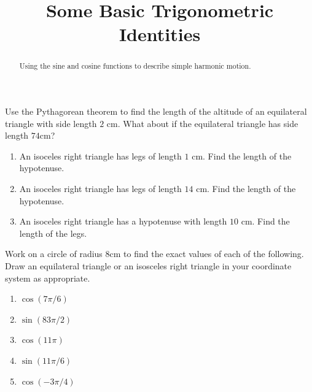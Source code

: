 \documentclass{ximera}
\title{Some Basic Trigonometric Identities}
\begin{document}
\begin{abstract}
Using the sine and cosine functions to describe simple harmonic motion.
\end{abstract}
\maketitle


\begin{question} \label{Qppf3}
Use the Pythagorean theorem to find the length of the altitude of an equilateral triangle with side length $2$ cm. What about if the equilateral triangle has side length $74$cm?
\end{question}

\begin{question} \label{Qof3efr3}
\begin{enumerate}
\item An isoceles right triangle has legs of length $1$ cm. Find the length of the hypotenuse.

\item An isoceles right triangle has legs of length $14$ cm. Find the length of the hypotenuse.

\item An isoceles right triangle has a hypotenuse with length $10$ cm. Find the length of the legs.
\end{enumerate}
\end{question}


\begin{question} \label{Qpefere3}
Work on a circle of radius $8$cm to find the exact values of each of the following. Draw an equilateral triangle or an isosceles right triangle in your coordinate system as appropriate.

\begin{enumerate}
\item $\cos(7\pi/6)$

\item $\sin(83\pi/2)$

\item $\cos(11\pi)$

\item $\sin(11\pi/6)$

\item $\cos(-3\pi/4)$
\end{enumerate}
\end{question}
\end{document}
